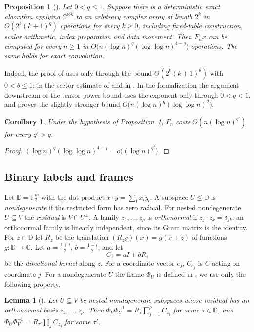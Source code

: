 \documentclass[11pt]{article}
\newtheorem{lemma}[theorem]{Lemma}
\newtheorem{proposition}[theorem]{Proposition}
\newtheorem{corollary}[theorem]{Corollary}
\theoremstyle{definition}
\theoremstyle{remark}
\newcommand{\F}{\mathbb{F}_2}
\newcommand{\C}{\mathbb{C}}
\begin{document}
\begin{proposition}[{\cite[Sections~3--5]{oai}}]\label{prop:reduction}
Let $0<q\le1$. Suppose there is a deterministic exact algorithm applying $C^{\otimes k}$ to an arbitrary
complex array of length $2^k$ in $O(2^k(k+1)^q)$ operations for every $k\ge0$, including fixed-table
construction, scalar arithmetic, index preparation and data movement. Then $F_nx$ can be computed for
every $n\ge1$ in $O\big(n(\log n)^q(\log\log n)^{4-q}\big)$ operations. The same holds for exact
convolution.
\end{proposition}

Indeed, the proof of \cite[Theorem~1.1]{oai} uses \cite[Theorem~2.6]{oai} only through the bound
$O(2^k(k+1)^\theta)$ with $0<\theta\le1$: in the sector estimate of \cite[Proposition~4.2]{oai} and in
\cite[Section~5]{oai}. In the formalization \cite{oailean} the argument downstream of the tensor-power
bound uses the exponent only through $0<q<1$, and proves the slightly stronger bound
$O\big(n(\log n)^q(\log\log n)^2\big)$.

\begin{corollary}\label{cor:reduction}
Under the hypothesis of Proposition~\ref{prop:reduction}, $F_n$ costs $O(n(\log n)^{q'})$ for every
$q'>q$.
\end{corollary}
\begin{proof}
$(\log n)^q(\log\log n)^{4-q}=o\big((\log n)^{q'}\big)$.
\end{proof}

\subsection{Binary labels and frames}
Let $\mathbb D=\F^m$ with the dot product $x\cdot y=\sum_ix_iy_i$. A subspace $U\le\mathbb D$ is
\emph{nondegenerate} if the restricted form has zero radical. For nested nondegenerate $U\subseteq V$ the
\emph{residual} is $V\cap U^\perp$. A family $z_1,\dots,z_\rho$ is \emph{orthonormal} if
$z_j\cdot z_k=\delta_{jk}$; an orthonormal family is linearly independent, since its Gram matrix is the
identity. For $z\in\mathbb D$ let $R_z$ be the translation $(R_zg)(x)=g(x+z)$ of functions
$g:\mathbb D\to\C$. Let $a=\frac{1+i}2$, $b=\frac{1-i}2$, and let
\[
  C_z=aI+bR_z
\]
be the \emph{directional kernel} along $z$. For a coordinate vector $e_j$, $C_{e_j}$ is $C$ acting on
coordinate $j$. For a nondegenerate $U$ the frame $\Phi_U$ is defined in \cite[(2.5)]{oai}; we use only
the following property.

\begin{lemma}[{\cite[Lemma~2.2]{oai}}]\label{lem:frames}
Let $U\subseteq V$ be nested nondegenerate subspaces whose residual has an orthonormal basis
$z_1,\dots,z_\rho$. Then $\Phi_V\Phi_U^{-1}=R_\tau\prod_{j=1}^\rho C_{z_j}$ for some $\tau\in\mathbb D$,
and $\Phi_U\Phi_V^{-1}=R_{\tau'}\prod_jC_{z_j}$ for some $\tau'$.
\end{lemma}
\end{document}
